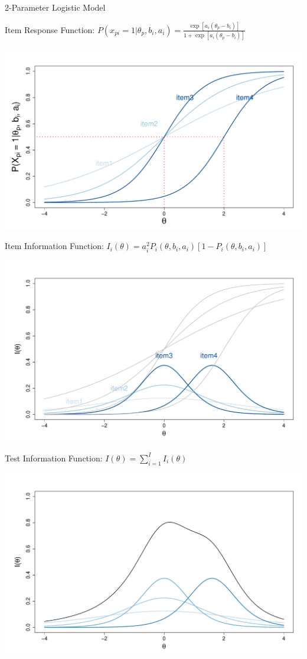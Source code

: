 \documentclass[aspectratio=149, xcolor=table]{beamer}
\begin{document}
\begin{frame}{2-Parameter Logistic Model}


\centering
\begin{overprint}

\centering
		\vspace*{1mm}
		
Item Response Function:	$P(x_{pi} = 1|\theta_p, b_i, a_i) = \frac{\exp[a_i(\theta_p - b_i)]}{1 + \exp[a_i(\theta_p - b_i)]}$
	
\vspace{1.5mm}
	\centering
	\includegraphics[width=.70\linewidth]{img/ICC-2pl.pdf}
	
		\vspace*{3mm}
		
Item Information Function:	$I_i(\theta) = a_i^2P_i(\theta, b_i, a_i)[1-P_i(\theta, b_i, a_i)]$
	
	\centering
	\includegraphics[width=.70\linewidth]{img/IIF-2pl.pdf}
	
		\vspace*{3mm}
Test Information Function:		$I(\theta) =  \sum_{i = 1}^{I} I_i(\theta)$
	
	\centering
	\includegraphics[width=.70\linewidth]{img/TIF-2pl.pdf}
\end{overprint}
			
	
	
	
\end{frame}
\end{document}
